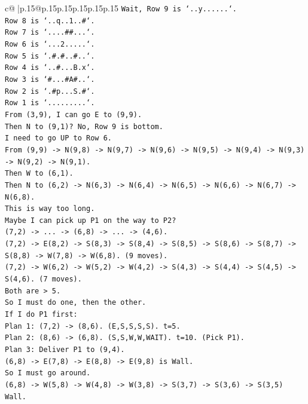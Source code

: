 \documentclass{article}
\begin{document}
{\begin{supertabular}{c@{$\;$}|p{.15\linewidth}@{}p{.15\linewidth}p{.15\linewidth}p{.15\linewidth}p{.15\linewidth}p{.15\linewidth}}
{{{\texttt{Wait, Row 9 is `..y......`.} \\
\texttt{Row 8 is `..q..1..\#`.} \\
\texttt{Row 7 is `....\#\#...`.} \\
\texttt{Row 6 is `...2.....`.} \\
\texttt{Row 5 is `.\#.\#..\#..`.} \\
\texttt{Row 4 is `..\#...B.x`.} \\
\texttt{Row 3 is `\#...\#A\#..`.} \\
\texttt{Row 2 is `.\#p...S.\#`.} \\
\texttt{Row 1 is `.........`.} \\
\texttt{From (3,9), I can go E to (9,9).} \\
\texttt{Then N to (9,1)? No, Row 9 is bottom.} \\
\texttt{I need to go UP to Row 6.} \\
\texttt{From (9,9) {-}> N(9,8) {-}> N(9,7) {-}> N(9,6) {-}> N(9,5) {-}> N(9,4) {-}> N(9,3) {-}> N(9,2) {-}> N(9,1).} \\
\texttt{Then W to (6,1).} \\
\texttt{Then N to (6,2) {-}> N(6,3) {-}> N(6,4) {-}> N(6,5) {-}> N(6,6) {-}> N(6,7) {-}> N(6,8).} \\
\texttt{This is way too long.} \\
\texttt{Maybe I can pick up P1 on the way to P2?} \\
\texttt{(7,2) {-}> ... {-}> (6,8) {-}> ... {-}> (4,6).} \\
\texttt{(7,2) {-}> E(8,2) {-}> S(8,3) {-}> S(8,4) {-}> S(8,5) {-}> S(8,6) {-}> S(8,7) {-}> S(8,8) {-}> W(7,8) {-}> W(6,8). (9 moves).} \\
\texttt{(7,2) {-}> W(6,2) {-}> W(5,2) {-}> W(4,2) {-}> S(4,3) {-}> S(4,4) {-}> S(4,5) {-}> S(4,6). (7 moves).} \\
\texttt{Both are > 5.} \\
\texttt{So I must do one, then the other.} \\
\texttt{If I do P1 first:} \\
\texttt{Plan 1: (7,2) {-}> (8,6). (E,S,S,S,S). t=5.} \\
\texttt{Plan 2: (8,6) {-}> (6,8). (S,S,W,W,WAIT). t=10. (Pick P1).} \\
\texttt{Plan 3: Deliver P1 to (9,4).} \\
\texttt{(6,8) {-}> E(7,8) {-}> E(8,8) {-}> E(9,8) is Wall.} \\
\texttt{So I must go around.} \\
\texttt{(6,8) {-}> W(5,8) {-}> W(4,8) {-}> W(3,8) {-}> S(3,7) {-}> S(3,6) {-}> S(3,5) Wall.} \\
}}}
\end{supertabular}}
\end{document}
